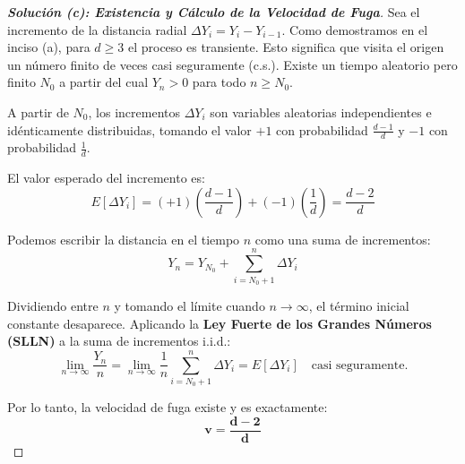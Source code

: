 \documentclass[10pt,a4paper]{article}
\begin{document}
\vspace{5mm}

\begin{proof}[\textbf{Solución (c): Existencia y Cálculo de la Velocidad de Fuga}]
    Sea el incremento de la distancia radial $\Delta Y_i = Y_i - Y_{i-1}$.
    Como demostramos en el inciso (a), para $d \ge 3$ el proceso es transiente. Esto significa que visita el origen un número finito de veces casi seguramente (c.s.).
    Existe un tiempo aleatorio pero finito $N_0$ a partir del cual $Y_n > 0$ para todo $n \ge N_0$.
    
    A partir de $N_0$, los incrementos $\Delta Y_i$ son variables aleatorias independientes e idénticamente distribuidas, tomando el valor $+1$ con probabilidad $\frac{d-1}{d}$ y $-1$ con probabilidad $\frac{1}{d}$.
    
    El valor esperado del incremento es:
    \[ E[\Delta Y_i] = (+1)\left(\frac{d-1}{d}\right) + (-1)\left(\frac{1}{d}\right) = \frac{d-2}{d} \]
    
    Podemos escribir la distancia en el tiempo $n$ como una suma de incrementos:
    \[ Y_n = Y_{N_0} + \sum_{i=N_0+1}^n \Delta Y_i \]
    
    Dividiendo entre $n$ y tomando el límite cuando $n \to \infty$, el término inicial constante desaparece. Aplicando la \textbf{Ley Fuerte de los Grandes Números (SLLN)} a la suma de incrementos i.i.d.:
    \[ \lim_{n \to \infty} \frac{Y_n}{n} = \lim_{n \to \infty} \frac{1}{n} \sum_{i=N_0+1}^n \Delta Y_i = E[\Delta Y_i] \quad \text{casi seguramente.} \]
    
    Por lo tanto, la velocidad de fuga existe y es exactamente:
    \[ \mathbf{v = \frac{d-2}{d}} \]
\end{proof}

\vspace{5mm}
\end{document}
